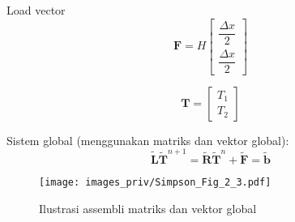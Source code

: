 Load vector
\begin{equation*}
\mathbf{F} = H\begin{bmatrix}
\dfrac{\Delta x}{2} \\
\dfrac{\Delta x}{2}
\end{bmatrix}
\end{equation*}

$$
\mathbf{T} = \begin{bmatrix}
T_1 \\ T_2
\end{bmatrix}
$$

Sistem global (menggunakan matriks dan vektor global):
\begin{equation*}
\tilde{\mathbf{L}} \tilde{\mathbf{T}}^{n+1} = \tilde{\mathbf{R}}
\tilde{\mathbf{T}}^{n} + \tilde{\mathbf{F}} = \tilde{\mathbf{b}}
\end{equation*}


\begin{figure}[h]
{\centering
\texttt{[image: images\_priv/Simpson\_Fig\_2\_3.pdf]}
\par}
\caption{Ilustrasi assembli matriks dan vektor global}
\end{figure}


%
%


